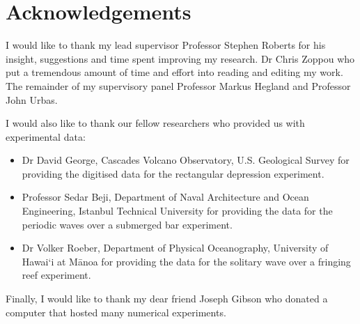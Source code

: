 
\chapter*{Acknowledgements}\label{acknowledgements}




I would like to thank my lead supervisor Professor Stephen Roberts for his insight, suggestions and time spent improving my research. Dr Chris Zoppou who put a tremendous amount of time and effort into reading and editing my work. The remainder of my supervisory panel Professor Markus Hegland and Professor John Urbas.


I would also like to thank our fellow researchers who provided us with experimental data:
\begin{itemize}
	\item Dr David George, Cascades Volcano Observatory, U.S. Geological Survey for providing the digitised data for the rectangular depression experiment.
	\item Professor Sedar Beji, Department of Naval Architecture and Ocean Engineering, Istanbul Technical University for providing the data for the periodic waves over a submerged bar experiment.
	\item Dr Volker Roeber, Department of Physical Oceanography, University of Hawai`i at M\={a}noa for providing the data for the solitary wave over a fringing reef experiment.  
\end{itemize}

Finally, I would like to thank my dear friend Joseph Gibson who donated a computer that hosted many numerical experiments. 
